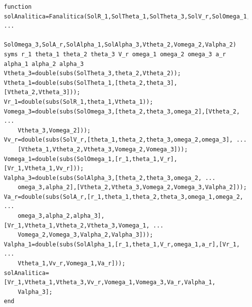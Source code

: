 \documentclass[12pt]{article}
\begin{document}
\begin{lstlisting}
function solAnalitica=Fanalitica(SolR_1,SolTheta_1,SolTheta_3,SolV_r,SolOmega_1, ...
    SolOmega_3,SolA_r,SolAlpha_1,SolAlpha_3,Vtheta_2,Vomega_2,Valpha_2)
syms r_1 theta_1 theta_2 theta_3 V_r omega_1 omega_2 omega_3 a_r alpha_1 alpha_2 alpha_3
Vtheta_3=double(subs(SolTheta_3,theta_2,Vtheta_2));
Vtheta_1=double(subs(SolTheta_1,[theta_2,theta_3],[Vtheta_2,Vtheta_3]));
Vr_1=double(subs(SolR_1,theta_1,Vtheta_1));
Vomega_3=double(subs(SolOmega_3,[theta_2,theta_3,omega_2],[Vtheta_2, ...
    Vtheta_3,Vomega_2]));
Vv_r=double(subs(SolV_r,[theta_1,theta_2,theta_3,omega_2,omega_3], ...
    [Vtheta_1,Vtheta_2,Vtheta_3,Vomega_2,Vomega_3]));
Vomega_1=double(subs(SolOmega_1,[r_1,theta_1,V_r],[Vr_1,Vtheta_1,Vv_r]));
Valpha_3=double(subs(SolAlpha_3,[theta_2,theta_3,omega_2, ...
    omega_3,alpha_2],[Vtheta_2,Vtheta_3,Vomega_2,Vomega_3,Valpha_2]));
Va_r=double(subs(SolA_r,[r_1,theta_1,theta_2,theta_3,omega_1,omega_2, ...
    omega_3,alpha_2,alpha_3],[Vr_1,Vtheta_1,Vtheta_2,Vtheta_3,Vomega_1, ...
    Vomega_2,Vomega_3,Valpha_2,Valpha_3]));
Valpha_1=double(subs(SolAlpha_1,[r_1,theta_1,V_r,omega_1,a_r],[Vr_1, ...
    Vtheta_1,Vv_r,Vomega_1,Va_r]));
solAnalitica=[Vr_1,Vtheta_1,Vtheta_3,Vv_r,Vomega_1,Vomega_3,Va_r,Valpha_1,
    Valpha_3];
end
\end{lstlisting}
\newpage
\end{document}
